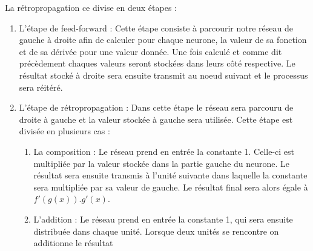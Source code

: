 \documentclass{article}
\begin{document}
La rétropropagation ce divise en deux étapes :
\begin{enumerate}
\item L'étape de feed-forward : Cette étape consiste à parcourir notre réseau de gauche à droite afin de calculer pour chaque neurone, la valeur de sa fonction et de sa dérivée pour une valeur donnée. Une fois calculé et comme dit précèdement chaques valeurs seront stockées dans leurs côté respective. Le résultat stocké à droite sera ensuite transmit au noeud suivant et le processus sera réitéré. %
\item L'étape de rétropropagation : Dans cette étape le réseau sera parcouru de droite à gauche et la valeur stockée à gauche sera 
utilisée. Cette étape est divisée en plusieurs cas :
\begin{enumerate}
\item La composition  : Le réseau prend en entrée la constante 1. Celle-ci est multipliée par la valeur stockée dans la partie gauche du neurone. Le résultat sera ensuite transmis à l'unité suivante dans laquelle la constante sera multipliée par sa valeur de gauche. Le résultat final sera alors égale à $f'(g(x)).g'(x)$.
\vfill
\begin{center}
\end{center}
\vfill
\item L'addition : Le réseau prend en entrée la constante 1, qui sera ensuite distribuée dans chaque unité. Lorsque deux unités se rencontre on additionne le résultat 

\end{enumerate}
\end{enumerate}
\end{document}
